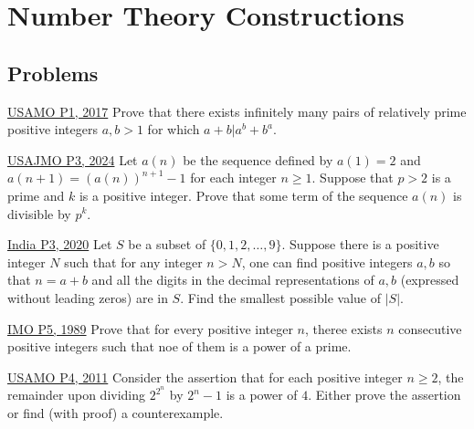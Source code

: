 \section{Number Theory Constructions}
\subsection{Problems}
\begin{problem}{1}{\href{https://artofproblemsolving.com/community/c5h1433969p8108366}{USAMO P1, 2017}} 
	Prove that there exists infinitely many pairs of relatively prime positive integers $a,b>1$ for which $a+b\lvert a^b+b^a$.
\end{problem}

\begin{problem}{2}{\href{https://artofproblemsolving.com/community/q2h3281033p34301017}{USAJMO P3, 2024}}
	Let $a(n)$ be the sequence defined by $a(1)=2$ and $a(n+1)=(a(n))^{n+1}-1$ for each integer $n\geq 1$. Suppose that $p>2$ is a prime and $k$ is a positive integer. Prove that some term of the sequence $a(n)$ is divisible by $p^k$.
\end{problem}

\begin{problem}{3}{\href{https://artofproblemsolving.com/community/c6h1989008p34732913}{India P3, 2020}}
	Let $S$ be a subset of $\{0,1,2,\dots ,9\}$. Suppose there is a positive integer $N$ such that for any integer $n>N$, one can find positive integers $a,b$ so that $n=a+b$ and all the digits in the decimal representations of $a,b$ (expressed without leading zeros) are in $S$. Find the smallest possible value of $|S|$.
\end{problem}

\begin{problem}{4}{\href{https://artofproblemsolving.com/community/c6h62176p35923955}{IMO P5, 1989}}
	Prove that for every positive integer $n$, theree exists $n$ consecutive positive integers such that noe of them is a power of a prime.
\end{problem}

\begin{problem}{5}{\href{https://artofproblemsolving.com/community/c5h404354p2254810}{USAMO P4, 2011}}
	Consider the assertion that for each positive integer $n\ge 2$, the remainder upon dividing $2^{2^n}$ by $2^n-1$ is a power of $4$. Either prove the assertion or find (with proof) a counterexample.
\end{problem}


